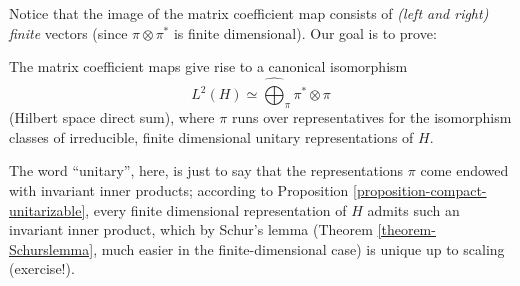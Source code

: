 Notice that the image of the matrix coefficient map consists of \emph{(left and right) finite} vectors (since $\pi\otimes\pi^*$ is finite dimensional). Our goal is to prove:

\begin{theorem}
\label{theorem-PeterWeyl}
The matrix coefficient maps give rise to a canonical isomorphism
$$L^2(H)\simeq \hat\bigoplus_\pi \pi^*\otimes \pi$$
(Hilbert space direct sum),
where $\pi$ runs over representatives for the isomorphism classes of irreducible, finite dimensional unitary representations of $H$.
\end{theorem}

The word ``unitary'', here, is just to say that the representations $\pi$ come endowed with invariant inner products; according to Proposition \ref{proposition-compact-unitarizable}, every finite dimensional representation of $H$ admits such an invariant inner product, which by Schur's lemma (Theorem \ref{theorem-Schurslemma}, much easier in the finite-dimensional case) is unique up to scaling (exercise!). 

